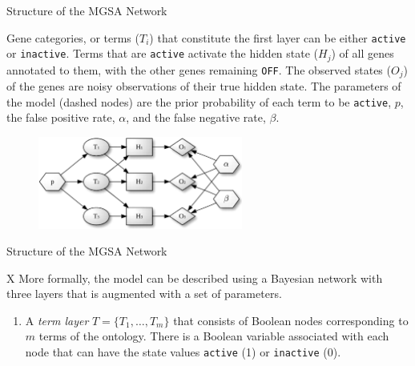 \documentclass{beamer}
\begin{document}
\begin{frame}[fragile]{Structure of the MGSA Network}

  Gene
categories, or terms ($T_i$) that constitute the first layer can be either
\texttt{active} or \texttt{inactive}. Terms that are \texttt{active} activate the hidden state
($H_j$) of all genes annotated to them, with the other genes remaining \texttt{OFF}. The
observed states ($O_j$) of the genes are noisy observations of
their true hidden state. The parameters of the model (dashed nodes) are the
prior probability of each term to be \texttt{active}, $p$, the false positive rate, $\alpha$,
and the false negative rate, $\beta$.
\begin{figure}
 \centering
 \includegraphics[width=0.6\textwidth]{./img/mgsa-F1.jpg}
\end{figure}

\end{frame}

\begin{frame}[fragile]{Structure of the MGSA Network}
 \begin{mybluebox}{X}
  More formally, the model can be described using a Bayesian network with three
layers that is augmented with a set of parameters.
 \end{mybluebox}
\begin{enumerate}
 \item A \emph{term layer} $T=\{T_1,\ldots,T_m\}$ that consists of Boolean nodes
 corresponding to $m$ terms of the ontology. There is a Boolean variable
 associated with each node that can have the state values \texttt{active} (1) or \texttt{inactive} 
(0). 
\end{enumerate}

 
 
\end{frame}
\end{document}
